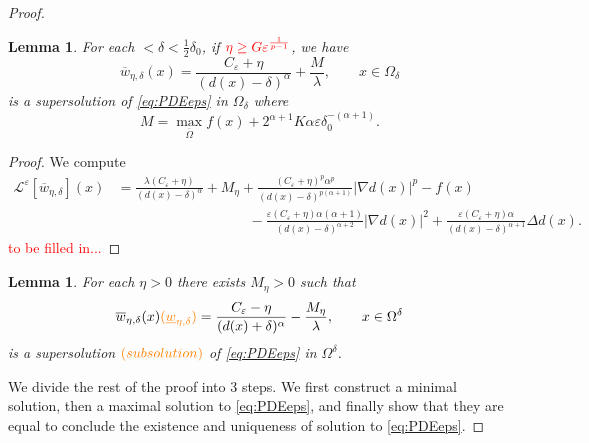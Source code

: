 \documentclass[11pt,reqno]{amsart}
\numberwithin{figure}{section}
\theoremstyle{plain}
\newtheorem{lem}[thm]{Lemma}
\theoremstyle{remark}
\numberwithin{equation}{section}
\begin{document}
\begin{proof}
\begin{lem}\label{lem:subsln} For each $<\delta < \frac{1}{2}\delta_0$, if $\color{red}\eta\geq G\varepsilon^{\frac{1}{p-1}}$,\color{black} we have
\begin{equation*}
    \overline{w}_{\eta,\delta}(x) = \frac{C_\varepsilon+\eta}{(d(x)-\delta)^\alpha} +\frac{M}{\lambda},\qquad x\in \Omega_\delta
\end{equation*}
is a supersolution of \eqref{eq:PDEeps} in $\Omega_\delta$ where
\begin{equation*}
    M = \max_{\overline{\Omega}} f(x) + 2^{\alpha+1}K\alpha\varepsilon\delta_0^{-(\alpha+1)}.
\end{equation*}
\end{lem}
\begin{proof} We compute
\begin{align*}
    \mathcal{L}^\varepsilon\left[\overline{w}_{\eta,\delta}\right](x) &= \frac{\lambda(C_\varepsilon + \eta)}{(d(x)-\delta)^\alpha} + M_\eta + \frac{(C_\varepsilon+\eta)^p \alpha^p}{(d(x)-\delta)^{p(\alpha+1)}}|\nabla d(x)|^p - f(x) \\
    &\qquad\qquad\qquad\qquad\quad\;\,  - \frac{\varepsilon(C_\varepsilon+\eta)\alpha(\alpha+1)}{(d(x)-\delta)^{\alpha+2}}|\nabla d(x)|^2 + \frac{\varepsilon(C_\varepsilon+\eta)\alpha}{(d(x)-\delta)^{\alpha+1}}\Delta d(x).
\end{align*}
\textcolor{red}{to be filled in...}
\end{proof}

\begin{lem}\label{lem:supersln} For each $\eta>0$ there exists $M_\eta > 0$ such that 
\begin{equation*}
    \overline{w}_{\eta,\delta}(x) \textcolor{orange}{(\underline{w}_{\eta, \delta})} = \frac{C_\varepsilon-\eta}{(d(x)+\delta)^\alpha} -\frac{M_\eta}{\lambda}, \qquad x\in \Omega^\delta 
\end{equation*}
is a supersolution $\textcolor{orange}{(subsolution)}$ of \eqref{eq:PDEeps} in $\Omega^\delta$.
\end{lem}


We divide the rest of the proof into 3 steps. We first construct a minimal solution, then a maximal solution to \eqref{eq:PDEeps}, and finally show that they are equal to conclude the existence and uniqueness of solution to \eqref{eq:PDEeps}.


\end{proof}
\end{document}

